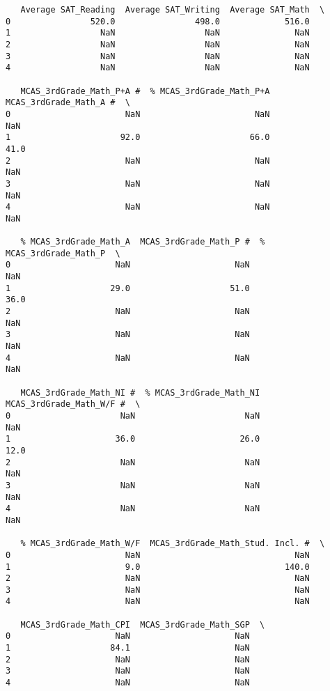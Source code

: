 \documentclass[11pt]{article}
\begin{document}
\begin{verbatim}
   Average SAT_Reading  Average SAT_Writing  Average SAT_Math  \
0                520.0                498.0             516.0   
1                  NaN                  NaN               NaN   
2                  NaN                  NaN               NaN   
3                  NaN                  NaN               NaN   
4                  NaN                  NaN               NaN   

   MCAS_3rdGrade_Math_P+A #  % MCAS_3rdGrade_Math_P+A  MCAS_3rdGrade_Math_A #  \
0                       NaN                       NaN                     NaN   
1                      92.0                      66.0                    41.0   
2                       NaN                       NaN                     NaN   
3                       NaN                       NaN                     NaN   
4                       NaN                       NaN                     NaN   

   % MCAS_3rdGrade_Math_A  MCAS_3rdGrade_Math_P #  % MCAS_3rdGrade_Math_P  \
0                     NaN                     NaN                     NaN   
1                    29.0                    51.0                    36.0   
2                     NaN                     NaN                     NaN   
3                     NaN                     NaN                     NaN   
4                     NaN                     NaN                     NaN   

   MCAS_3rdGrade_Math_NI #  % MCAS_3rdGrade_Math_NI  MCAS_3rdGrade_Math_W/F #  \
0                      NaN                      NaN                       NaN   
1                     36.0                     26.0                      12.0   
2                      NaN                      NaN                       NaN   
3                      NaN                      NaN                       NaN   
4                      NaN                      NaN                       NaN   

   % MCAS_3rdGrade_Math_W/F  MCAS_3rdGrade_Math_Stud. Incl. #  \
0                       NaN                               NaN   
1                       9.0                             140.0   
2                       NaN                               NaN   
3                       NaN                               NaN   
4                       NaN                               NaN   

   MCAS_3rdGrade_Math_CPI  MCAS_3rdGrade_Math_SGP  \
0                     NaN                     NaN   
1                    84.1                     NaN   
2                     NaN                     NaN   
3                     NaN                     NaN   
4                     NaN                     NaN   


\end{verbatim}
\end{document}
